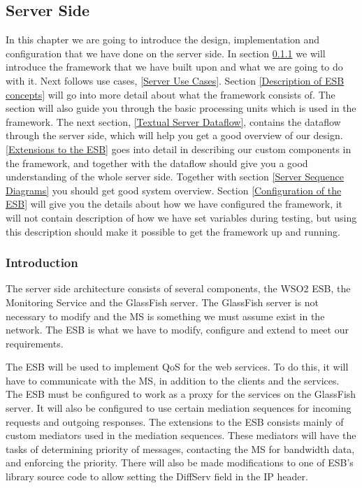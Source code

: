     \subsection{Server Side}\label{Server Side Design}
    In this chapter we are going to introduce the design, implementation and configuration that we have done on the server side. In section \ref{Server Introduction} we will introduce the framework that we have built upon and what we are going to do with it. Next follows use cases, \ref{Server Use Cases}. Section \ref{Description of ESB concepts} will go into more detail about what the framework consists of. The section will also guide you through the basic processing units which is used in the framework. The next section, \ref{Textual Server Dataflow}, contains the dataflow through the server side, which will help you get a good overview of our design. \ref{Extensions to the ESB} goes into detail in describing our custom components in the framework, and together with the dataflow should give you a good understanding of the whole server side. Together with section \ref{Server Sequence Diagrams} you should get good system overview. Section \ref{Configuration of the ESB} will give you the details about how we 
have configured the framework, it will not contain description of how we have set variables during testing, but using this description should make it possible to get the framework up and running.

    \subsubsection{Introduction}\label{Server Introduction}
    The server side architecture consists of several components, the WSO2 ESB, the Monitoring Service and the GlassFish server. The GlassFish server is not necessary to modify and the MS is something we must assume exist in the network. The ESB is what we have to modify, configure and extend to meet our requirements.

    The ESB will be used to implement QoS for the web services. To do this, it will have to communicate with the MS, in addition to the clients and the services. The ESB must be configured to work as a proxy for the services on the GlassFish server. It will also be configured to use certain mediation sequences for incoming requests and outgoing responses. The extensions to the ESB consists mainly of custom mediators used in the mediation sequences. These mediators will have the tasks of determining priority of messages, contacting the MS for bandwidth data, and enforcing the priority. There will also be made modifications to one of ESB's library source code to allow setting the DiffServ field in the IP header.
    
